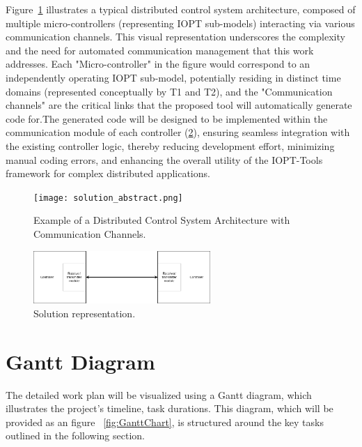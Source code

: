 Figure~\ref{fig:distributed_system_example} illustrates a typical distributed control system architecture, composed of multiple micro-controllers (representing IOPT sub-models) interacting via various communication channels. This visual representation underscores the complexity and the need for automated communication management that this work addresses. Each "Micro-controller" in the figure would correspond to an independently operating IOPT sub-model, potentially residing in distinct time domains (represented conceptually by T1 and T2), and the "Communication channels" are the critical links that the proposed tool will automatically generate code for.The generated code will be designed to be implemented within the communication module of each controller (\ref{fig:representation}), ensuring seamless integration with the existing controller logic, thereby reducing development effort, minimizing manual coding errors, and enhancing the overall utility of the IOPT-Tools framework for complex distributed applications.

 
\begin{figure}[htbp]
  \centering
  \texttt{[image: solution\_abstract.png]}
  \caption{Example of a Distributed Control System Architecture with Communication Channels.}
  \label{fig:distributed_system_example}
\end{figure}

 \begin{figure}[htbp]
  \centering
  \includegraphics[width=0.6\textwidth]{Chapters/Figures/Diagrama.png}
  \caption{Solution representation.}
  \label{fig:representation}
\end{figure}
 
 
 
\section{Gantt Diagram }
\label{sec:gant_diagram}


The detailed work plan will be visualized using a Gantt diagram, which illustrates the project's timeline, task durations. This diagram, which will be provided as an figure ~\ref{fig:GanttChart}, is structured around the key tasks outlined in the following section.

